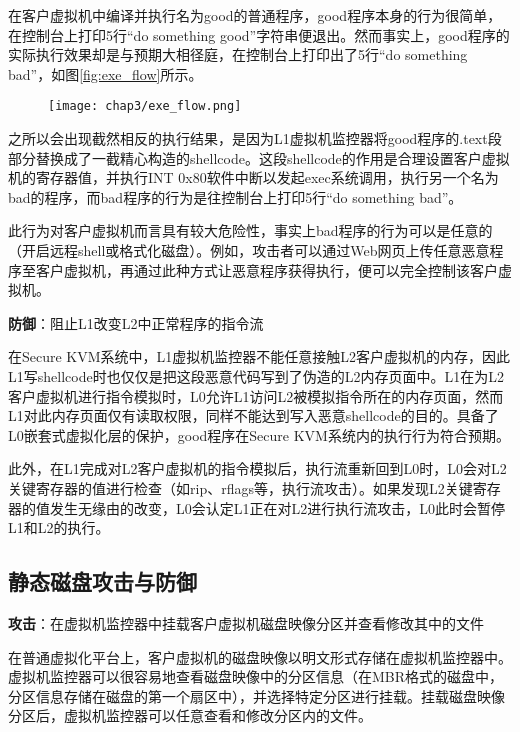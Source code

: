 在客户虚拟机中编译并执行名为good的普通程序，good程序本身的行为很简单，在控制台上打印5行``do something good''字符串便退出。然而事实上，good程序的实际执行效果却是与预期大相径庭，在控制台上打印出了5行``do something bad''，如图\ref{fig:exe_flow}所示。

\begin{figure}[!htbp]
  \centering
  \texttt{[image: chap3/exe\_flow.png]}
\end{figure}

之所以会出现截然相反的执行结果，是因为L1虚拟机监控器将good程序的.text段部分替换成了一截精心构造的shellcode。这段shellcode的作用是合理设置客户虚拟机的寄存器值，并执行INT 0x80软件中断以发起exec系统调用，执行另一个名为bad的程序，而bad程序的行为是往控制台上打印5行``do something bad''。

此行为对客户虚拟机而言具有较大危险性，事实上bad程序的行为可以是任意的（开启远程shell或格式化磁盘）。例如，攻击者可以通过Web网页上传任意恶意程序至客户虚拟机，再通过此种方式让恶意程序获得执行，便可以完全控制该客户虚拟机。

\noindent
\textbf{防御\uppercase\expandafter{}}：阻止L1改变L2中正常程序的指令流

在Secure KVM系统中，L1虚拟机监控器不能任意接触L2客户虚拟机的内存，因此L1写shellcode时也仅仅是把这段恶意代码写到了伪造的L2内存页面中。L1在为L2客户虚拟机进行指令模拟时，L0允许L1访问L2被模拟指令所在的内存页面，然而L1对此内存页面仅有读取权限，同样不能达到写入恶意shellcode的目的。具备了L0嵌套式虚拟化层的保护，good程序在Secure KVM系统内的执行行为符合预期。

此外，在L1完成对L2客户虚拟机的指令模拟后，执行流重新回到L0时，L0会对L2关键寄存器的值进行检查（如rip、rflags等，执行流攻击）。如果发现L2关键寄存器的值发生无缘由的改变，L0会认定L1正在对L2进行执行流攻击，L0此时会暂停L1和L2的执行。

\subsection{静态磁盘攻击与防御}

\noindent
\textbf{攻击\uppercase\expandafter{}}：在虚拟机监控器中挂载客户虚拟机磁盘映像分区并查看修改其中的文件

在普通虚拟化平台上，客户虚拟机的磁盘映像以明文形式存储在虚拟机监控器中。虚拟机监控器可以很容易地查看磁盘映像中的分区信息（在MBR格式的磁盘中，分区信息存储在磁盘的第一个扇区中），并选择特定分区进行挂载。挂载磁盘映像分区后，虚拟机监控器可以任意查看和修改分区内的文件。

